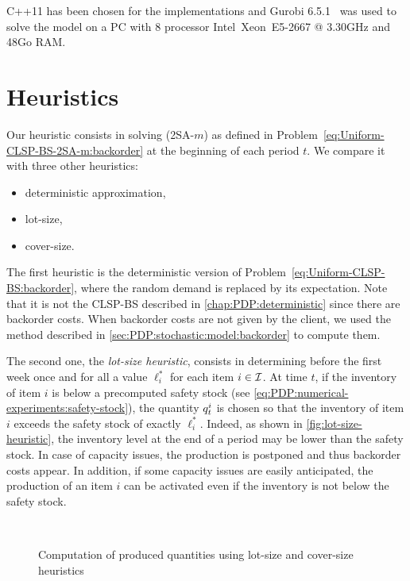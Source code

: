 C++11 has been chosen for the implementations and Gurobi 6.5.1~\citet{gurobi} was used to solve the model on a PC with 8 processor Intel\textregistered\ Xeon\texttrademark\ E5-2667 @ 3.30GHz and 48Go RAM.




\section{Heuristics}
\label{sec:PDP:numerical-experiments:heuristics}


Our heuristic consists in solving (2SA-$m$) as defined in Problem~\eqref{eq:Uniform-CLSP-BS-2SA-m:backorder} at the beginning of each period $t$.
We compare it with three other heuristics:
\begin{itemize}
  \item deterministic approximation,
  \item lot-size,
  \item cover-size.
\end{itemize}


The first heuristic is the deterministic version of Problem~\eqref{eq:Uniform-CLSP-BS:backorder}, where the random demand is replaced by its expectation.
Note that it is not the CLSP-BS described in \cref{chap:PDP:deterministic} since there are backorder costs.
When backorder costs are not given by the client, we used the method described in \cref{sec:PDP:stochastic:model:backorder} to compute them.


The second one, the {\em lot-size heuristic}, consists in determining before the first week once and for all a value $\ell_i^*$ for each item $i\in\mathcal{I}$.
At time $t$, if the inventory of item $i$ is below a precomputed safety stock (see \cref{eq:PDP:numerical-experiments:safety-stock}), the quantity $q_t^i$ is chosen so that the inventory of item $i$ exceeds the safety stock of exactly $\ell_i^*$.
Indeed, as shown in \cref{fig:lot-size-heuristic}, the inventory level at the end of a period may be lower than the safety stock.
In case of capacity issues, the production is postponed and thus backorder costs appear.
In addition, if some capacity issues are easily anticipated, the production of an item $i$ can be activated even if the inventory is not below the safety stock.

\begin{figure}[h]
  \centering
  \\
  \caption{Computation of produced quantities using lot-size and cover-size heuristics}
  \label{fig:lot-and-cover-size-heuristics}
\end{figure}


